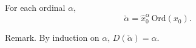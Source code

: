 For each ordinal $\alpha$,
$$\check{\alpha} = \hat{x}_0^\alpha \, \mathrm{Ord}(x_0).$$

Remark. By induction on $\alpha$, $D(\check{\alpha}) = \alpha$.
